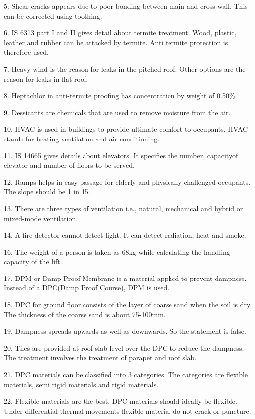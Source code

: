 \documentclass[11pt,a4paper]{article}
\begin{document}
5.
Shear cracks appears due to poor bonding between main and cross wall. This can be corrected using toothing.

6.
IS 6313 part I and II gives detail about termite treatment. Wood, plastic, leather and rubber can be attacked by termite. Anti termite protection is therefore used.

7.
Heavy wind is the reason for leaks in the pitched roof. Other options are the reason for leaks in flat roof.

8.
Heptachlor in anti-termite proofing has concentration by weight of 0.50\%.

9.
Dessicants are chemicals that are used to remove moisture from the air.

10.
HVAC is used in buildings to provide ultimate comfort to occupants. HVAC stands for heating ventilation and air-conditioning.

11.
IS 14665 gives details about elevators. It specifies the number, capacityof elevator and number of floors to be served.

12.
Ramps helps in easy passage for elderly and physically challenged occupants. The slope should be 1 in 15.

13.
There are three types of ventilation i.e., natural, mechanical and hybrid or mixed-mode ventilation.

14.
A fire detector cannot detect light. It can detect radiation, heat and smoke.

16.
The weight of a person is taken as 68kg while calculating the handling capacity of the lift.

17.
DPM or Damp Proof Membrane is a material applied to prevent dampness. Instead of a DPC(Damp Proof Course), DPM is used.

18.
DPC for ground floor consists of the layer of coarse sand when the soil is dry. The thickness of the coarse sand is about 75-100mm.

19.
Dampness spreads upwards as well as downwards. So the statement is false.

20.
Tiles are provided at roof slab level over the DPC to reduce the dampness. The treatment involves the treatment of parapet and roof slab.

21.
DPC materials can be classified into 3 categories. The categories are flexible materials, semi rigid materials and rigid materials.

22.
Flexible materials are the best. DPC materials should ideally be flexible. Under differential thermal movements flexible material do not crack or puncture.
\end{document}
